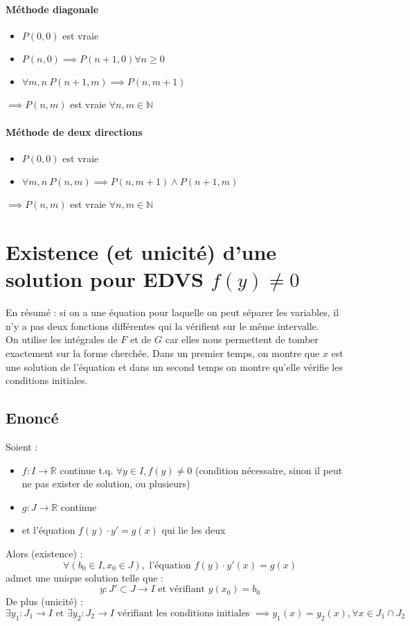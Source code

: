 \documentclass{article}
\begin{document}
\paragraph{Méthode diagonale}

\begin{itemize}
    \item $ P(0, 0) $ est vraie
    \item $ P(n, 0) \implies P(n + 1, 0) \forall n \geq 0 $ 
    \item $ \forall m, n\ P(n + 1, m) \implies P(n, m + 1) $
\end{itemize}
$ \implies P(n, m) $ est vraie $ \forall n, m \in \mathbb{N} $

\paragraph{Méthode de deux directions}

\begin{itemize}
    \item $ P(0, 0) $ est vraie
    \item $ \forall m, n\ P(n, m) \implies P(n, m + 1) \wedge P(n + 1, m) $ 
\end{itemize}
$ \implies P(n, m) $ est vraie $ \forall n, m \in \mathbb{N} $

\newpage

\section{Existence (et unicité) d'une solution pour EDVS $f(y) \neq 0$}

En résumé : si on a une équation pour laquelle on peut séparer les variables, il n'y a pas deux fonctions différentes qui la vérifient sur le même intervalle.\\
On utilise les intégrales de $F$ et de $G$ car elles nous permettent de tomber exactement sur la forme cherchée. Dans un premier temps, on montre que $x$ est une solution de l'équation et dans un second temps on montre qu'elle vérifie les conditions initiales.

\subsection{Enoncé}

Soient :
\begin{itemize}
    \item $ f: I \to \mathbb{R} $ continue t.q. $  \forall y \in I, f(y) \neq 0 $ (condition nécessaire, sinon il peut ne pas exister de solution, ou plusieurs)
    \item $ g: J \to \mathbb{R} $ continue
    \item et l'équation $ f(y) \cdot y' = g(x) $ qui lie les deux
\end{itemize}
Alors (existence) : 
\[ \forall (b_0 \in I, x_0 \in J), \text{ l'équation } f(y) \cdot y'(x) = g(x) \]
admet une unique solution telle que :
\[ y : J' \subset J \to I \text{ et vérifiant } y(x_0) = b_0 \]
De plus (unicité) :
\[ \exists y_1 : J_1 \to I \text{ et } \exists y_2 : J_2 \to I \text{ vérifiant les conditions initiales } \implies y_1(x) = y_2(x), \forall x \in J_1 \cap J_2 \]
\end{document}
